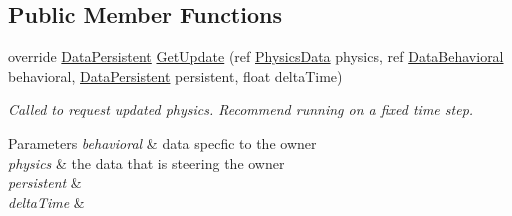 \subsection*{Public Member Functions}
\begin{DoxyCompactItemize}
\item 
\hypertarget{class_skyrates_1_1_a_i_1_1_custom_1_1_ship_rotation_a1bf8ad2defba57a5ec67d7a79c295f3a}{override \hyperlink{class_skyrates_1_1_a_i_1_1_behavior_1_1_data_persistent}{Data\-Persistent} \hyperlink{class_skyrates_1_1_a_i_1_1_custom_1_1_ship_rotation_a1bf8ad2defba57a5ec67d7a79c295f3a}{Get\-Update} (ref \hyperlink{class_skyrates_1_1_physics_1_1_physics_data}{Physics\-Data} physics, ref \hyperlink{class_skyrates_1_1_a_i_1_1_behavior_1_1_data_behavioral}{Data\-Behavioral} behavioral, \hyperlink{class_skyrates_1_1_a_i_1_1_behavior_1_1_data_persistent}{Data\-Persistent} persistent, float delta\-Time)}\label{class_skyrates_1_1_a_i_1_1_custom_1_1_ship_rotation_a1bf8ad2defba57a5ec67d7a79c295f3a}

\begin{DoxyCompactList}\small\item\em Called to request updated physics. Recommend running on a fixed time step. 


\begin{DoxyParams}{Parameters}
{\em behavioral} & data specfic to the owner\\
\hline
{\em physics} & the data that is steering the owner\\
\hline
{\em persistent} & \\
\hline
{\em delta\-Time} & \\
\hline
\end{DoxyParams}
 \end{DoxyCompactList}\end{DoxyCompactItemize}
